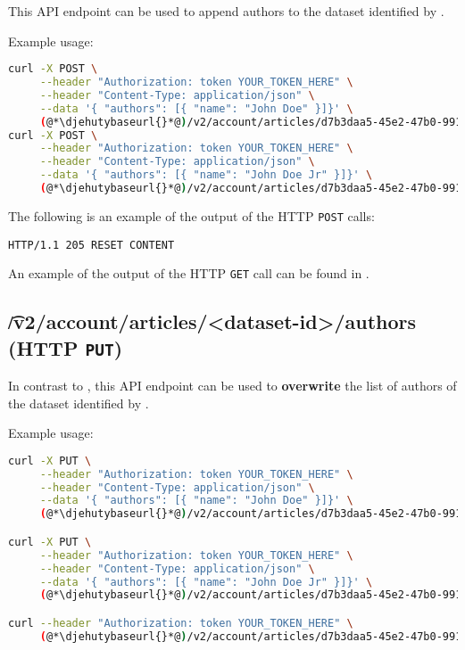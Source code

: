   This API endpoint can be used to append authors to the dataset identified
  by .

  Example usage:
\begin{lstlisting}[language=bash]
curl -X POST \
     --header "Authorization: token YOUR_TOKEN_HERE" \
     --header "Content-Type: application/json" \
     --data '{ "authors": [{ "name": "John Doe" }]}' \
     (@*\djehutybaseurl{}*@)/v2/account/articles/d7b3daa5-45e2-47b0-9910-0f7fa6a995b1/authors
curl -X POST \
     --header "Authorization: token YOUR_TOKEN_HERE" \
     --header "Content-Type: application/json" \
     --data '{ "authors": [{ "name": "John Doe Jr" }]}' \
     (@*\djehutybaseurl{}*@)/v2/account/articles/d7b3daa5-45e2-47b0-9910-0f7fa6a995b1/authors
\end{lstlisting}

  The following is an example of the output of the HTTP \texttt{POST} calls:
\begin{lstlisting}
HTTP/1.1 205 RESET CONTENT
\end{lstlisting}

  An example of the output of the HTTP \texttt{GET} call can be found in
  .

\subsection{\t{/v2/account/articles/<dataset-id>/authors} (HTTP \texttt{PUT})}

  In contrast to , this API endpoint
  can be used to \textbf{overwrite} the list of authors of the dataset identified
  by .

  Example usage:
\begin{lstlisting}[language=bash]
curl -X PUT \
     --header "Authorization: token YOUR_TOKEN_HERE" \
     --header "Content-Type: application/json" \
     --data '{ "authors": [{ "name": "John Doe" }]}' \
     (@*\djehutybaseurl{}*@)/v2/account/articles/d7b3daa5-45e2-47b0-9910-0f7fa6a995b1/authors

curl -X PUT \
     --header "Authorization: token YOUR_TOKEN_HERE" \
     --header "Content-Type: application/json" \
     --data '{ "authors": [{ "name": "John Doe Jr" }]}' \
     (@*\djehutybaseurl{}*@)/v2/account/articles/d7b3daa5-45e2-47b0-9910-0f7fa6a995b1/authors

curl --header "Authorization: token YOUR_TOKEN_HERE" \
     (@*\djehutybaseurl{}*@)/v2/account/articles/d7b3daa5-45e2-47b0-9910-0f7fa6a995b1 | jq
\end{lstlisting}

